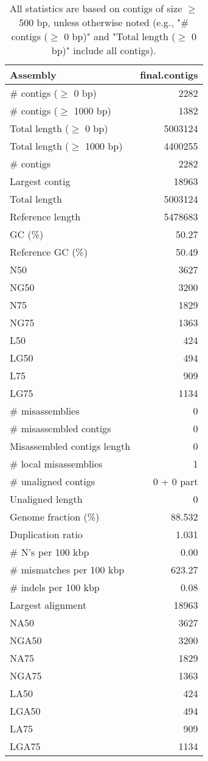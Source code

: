 \documentclass[12pt,a4paper]{article}
\begin{document}
\begin{table}[ht]
\begin{center}
\caption{All statistics are based on contigs of size $\geq$ 500 bp, unless otherwise noted (e.g., "\# contigs ($\geq$ 0 bp)" and "Total length ($\geq$ 0 bp)" include all contigs).}
\begin{tabular}{|l*{1}{|r}|}
\hline
Assembly & final.contigs \\ \hline
\# contigs ($\geq$ 0 bp) & 2282 \\ \hline
\# contigs ($\geq$ 1000 bp) & 1382 \\ \hline
Total length ($\geq$ 0 bp) & 5003124 \\ \hline
Total length ($\geq$ 1000 bp) & 4400255 \\ \hline
\# contigs & 2282 \\ \hline
Largest contig & 18963 \\ \hline
Total length & 5003124 \\ \hline
Reference length & 5478683 \\ \hline
GC (\%) & 50.27 \\ \hline
Reference GC (\%) & 50.49 \\ \hline
N50 & 3627 \\ \hline
NG50 & 3200 \\ \hline
N75 & 1829 \\ \hline
NG75 & 1363 \\ \hline
L50 & 424 \\ \hline
LG50 & 494 \\ \hline
L75 & 909 \\ \hline
LG75 & 1134 \\ \hline
\# misassemblies & 0 \\ \hline
\# misassembled contigs & 0 \\ \hline
Misassembled contigs length & 0 \\ \hline
\# local misassemblies & 1 \\ \hline
\# unaligned contigs & 0 + 0 part \\ \hline
Unaligned length & 0 \\ \hline
Genome fraction (\%) & 88.532 \\ \hline
Duplication ratio & 1.031 \\ \hline
\# N's per 100 kbp & 0.00 \\ \hline
\# mismatches per 100 kbp & 623.27 \\ \hline
\# indels per 100 kbp & 0.08 \\ \hline
Largest alignment & 18963 \\ \hline
NA50 & 3627 \\ \hline
NGA50 & 3200 \\ \hline
NA75 & 1829 \\ \hline
NGA75 & 1363 \\ \hline
LA50 & 424 \\ \hline
LGA50 & 494 \\ \hline
LA75 & 909 \\ \hline
LGA75 & 1134 \\ \hline
\end{tabular}
\end{center}
\end{table}
\end{document}
